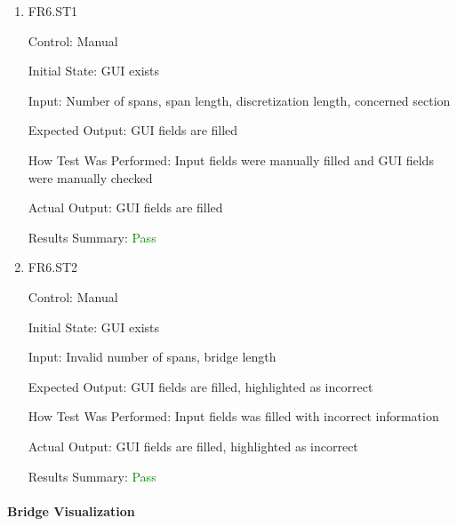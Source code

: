 \documentclass[12pt, titlepage]{article}
\begin{document}
\begin{enumerate}

  \item{FR6.ST1\\}

    Control: Manual
            
    Initial State: GUI exists
                    
    Input: Number of spans, span length, discretization length, concerned section
                    
    Expected Output: GUI fields are filled
    
    How Test Was Performed: Input fields were manually filled and GUI fields were manually checked
            
    Actual Output: GUI fields are filled
    
    Results Summary: \textcolor{green} {Pass}
  
  \item{FR6.ST2\\}
  
  Control: Manual
  
  Initial State: GUI exists
  
  Input: Invalid number of spans, bridge length
  
  Expected Output: GUI fields are filled, highlighted as incorrect
  
  How Test Was Performed: Input fields was filled with incorrect information
  
  Actual Output: GUI fields are filled, highlighted as incorrect
  
  Results Summary: \textcolor{green} {Pass}

\end{enumerate}

\paragraph{Bridge Visualization}
\end{document}
